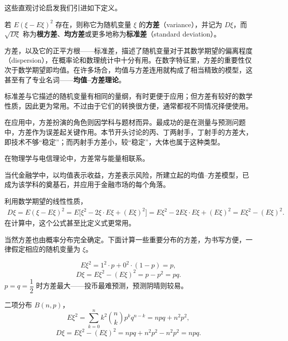 \documentclass[../../main.tex]{subfiles}
\begin{document}
这些直观讨论启发我们引进如下定义。

\begin{definition}[方差与标准差]\label{definition:ch04-方差}
若 $E(\xi-E\xi)^2$ 存在，则称它为随机变量 $\xi$ 的\textbf{方差}（variance），并记为 $D\xi$，而 $\sqrt{D\xi}$ 称为\textbf{根方差}、\textbf{均方差}或更多地称为\textbf{标准差}（standard deviation）。
\end{definition}

方差，以及它的正平方根——标准差，描述了随机变量对于其数学期望的偏离程度（dispersion），在概率论和数理统计中十分有用。在数字特征里，方差的重要性仅次于数学期望即均值。在许多场合，均值与方差连用就构成了相当精致的模型，这甚至有了专业名词——\textbf{均值--方差理论}。

标准差与它描述的随机变量有相同的量纲，有时更便于应用；但方差有较好的数学性质，因此更为常用。不过由于它们的转换很方便，通常都视不同情况择便使用。

在应用中，方差扮演的角色则因学科与题材而异。最成功的是在测量与预测问题中，方差作为误差起关键作用。本节开头讨论的丙、丁两射手，丁射手的方差大，即技术不够``稳定''；而丙射手方差小，较``稳定''，大体也属于这种类型。

在物理学与电信理论中，方差常与能量相联系。

当代金融学中，以均值表示收益，方差表示风险，所建立起的均值--方差模型，已成为该学科的奠基石，并应用于金融市场的每个角落。

利用数学期望的线性性质，
\begin{align}
D\xi=E(\xi-E\xi)^2=E\bigl[\xi^2-2\xi\cdot E\xi+(E\xi)^2\bigr]
=E\xi^2-2E\xi\cdot E\xi+(E\xi)^2=E\xi^2-(E\xi)^2.\label{align:ch04-方差计算公式}
\end{align}
在计算中，这个公式甚至比定义式更常用。

当然方差也由概率分布完全确定。下面计算一些重要分布的方差，为书写方便，一律假定相应的随机变量为 $\xi$。

\begin{example}\label{example:ch04-方差-Bernoulli}
\[
E\xi^2=1^2\cdot p+0^2\cdot(1-p)=p,
\]
\[
D\xi=E\xi^2-(E\xi)^2=p-p^2=pq.
\]
$p=q=\dfrac{1}{2}$ 时方差最大——投币最难预测，预测阴晴则较易。
\end{example}

\begin{example}[二项分布的方差]\label{example:ch04-方差-二项}
二项分布 $B(n,p)$，
\[
E\xi^2=\sum_{k=0}^n k^2\binom{n}{k}p^k q^{n-k}=npq+n^2p^2,
\]
\[
D\xi=E\xi^2-(E\xi)^2=npq+n^2p^2-n^2p^2=npq.
\]
\end{example}
\end{document}
